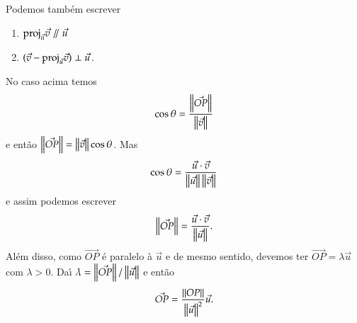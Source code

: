 Podemos tamb\'em escrever
\begin{enumerate}
  \item $\proj_{\vec{u}}\vec{v} \varparallel\vec{u}$
    \item $(\vec{v} - {\rm proj}_{\vec{u}}\vec{v}) \perp \vec{u}$.
\end{enumerate}

No caso acima temos
\[
  \cos\theta = \dfrac{\left\Vert{\vec{OP}}\right\Vert}{\left\Vert{\vec{v}}\right\Vert}
\]
e ent\~ao $\left\Vert{\vec{OP}}\right\Vert = \left\Vert{\vec{v}}\right\Vert\cos\theta$. Mas
\[
  \cos\theta = \dfrac{\vec{u}\cdot\vec{v}}{\left\Vert{\vec{u}}\right\Vert\left\Vert{\vec{v}}\right\Vert}
\]
e assim podemos escrever
\[
  \left\Vert{\vec{OP}}\right\Vert = \dfrac{\vec{u}\cdot\vec{v}}{\left\Vert{\vec{u}}\right\Vert}.
\]
Al\'em disso, como $\vec{OP}$ \'e paralelo \`a $\vec{u}$ e de mesmo sentido, devemos ter $\vec{OP} = \lambda\vec{u}$ com $\lambda > 0$. Da{\'\i}
$\lambda = \left\Vert{\vec{OP}}\right\Vert/\left\Vert{\vec{u}}\right\Vert$ e ent\~ao
\[
  \vec{OP} = \dfrac{\left\Vert{OP}\right\Vert}{\left\Vert{\vec{u}}\right\Vert^2}\vec{u}.
\]


